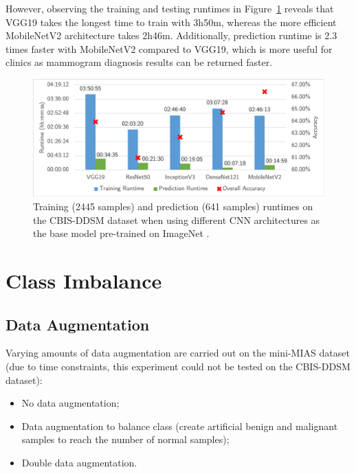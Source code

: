 However, observing the training and testing runtimes in Figure~\ref{fig:evaluation-CNN_models_experiment-runtimes} reveals that VGG19 takes the longest time to train with 3h50m, whereas the more efficient MobileNetV2 architecture takes 2h46m. Additionally, prediction runtime is 2.3 times faster with MobileNetV2 compared to VGG19, which is more useful for clinics as mammogram diagnosis results can be returned faster.

\begin{figure}[h]
\centerline{\includegraphics[width=\textwidth]{figures/evaluation/CNN_models_experiment/runtimes.png}}
\caption{\label{fig:evaluation-CNN_models_experiment-runtimes}Training (2445 samples) and prediction (641 samples) runtimes on the CBIS-DDSM dataset when using different CNN architectures as the base model pre-trained on ImageNet .}
\end{figure}


\section{Class Imbalance}

\subsection{Data Augmentation}

Varying amounts of data augmentation are carried out on the mini-MIAS dataset (due to time constraints, this experiment could not be tested on the CBIS-DDSM dataset):
\begin{itemize}
    \item No data augmentation;
    \item Data augmentation to balance class (create artificial benign and malignant samples to  reach the number of normal samples);
    \item Double data augmentation.
\end{itemize}

